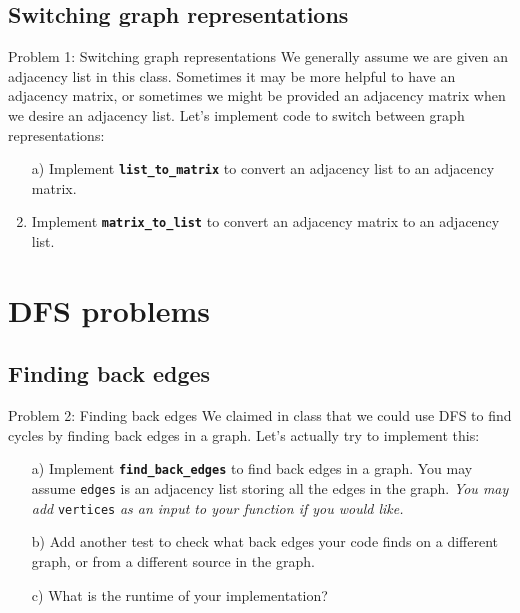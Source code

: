 \documentclass{article}
\begin{document}
\subsection{Switching graph representations}
\begin{problem}{Problem 1: Switching graph representations}
We generally assume we are given an adjacency list in this class. Sometimes it may be more helpful to have an adjacency matrix, or sometimes we might be provided an adjacency matrix when we desire an adjacency list. Let's implement code to switch between graph representations:
\begin{enumerate}
    \item[a)] Implement \textbf{\lstinline{list_to_matrix}} to convert an adjacency list to an adjacency matrix.
    \item[b)] Implement \textbf{\lstinline{matrix_to_list}} to convert an adjacency matrix to an adjacency list.
\end{enumerate}
\end{problem}

\newpage

\section{DFS problems}

\subsection{Finding back edges}
\begin{problem}{Problem 2: Finding back edges}
    We claimed in class that we could use DFS to find cycles by finding back edges in a graph. Let's actually try to implement this:

    \begin{enumerate}
        \item[a)] Implement \textbf{\lstinline{find_back_edges}} to find back edges in a graph. You may assume \lstinline{edges} is an adjacency list storing all the edges in the graph. \textit{You may add} \lstinline{vertices} \textit{as an input to your function if you would like. }
        \item[b)] Add another test to check what back edges your code finds on a different graph, or from a different source in the graph.
        \item[c)] What is the runtime of your implementation?
    \end{enumerate}
\end{problem}
\end{document}
